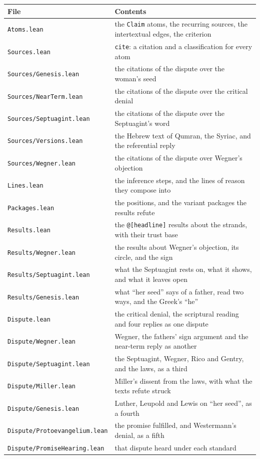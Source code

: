 \documentclass[11pt]{article}
\begin{document}
\begin{longtable}{@{}>{\raggedright\arraybackslash}p{} >{\raggedright\arraybackslash}p{}@{}}
\toprule
\textbf{File} & \textbf{Contents} \\
\midrule
\endhead
\texttt{Atoms.lean} & the \texttt{Claim} atoms, the recurring sources, the intertextual edges, the criterion \\
\texttt{Sources.lean} & \texttt{cite}: a citation and a classification for every atom \\
\texttt{Sources/Genesis.lean} & the citations of the dispute over the woman’s seed \\
\texttt{Sources/Near\allowbreak{}Term.lean} & the citations of the dispute over the critical denial \\
\texttt{Sources/Septuagint.lean} & the citations of the dispute over the Septuagint’s word \\
\texttt{Sources/Versions.lean} & the Hebrew text of Qumran, the Syriac, and the referential reply \\
\texttt{Sources/Wegner.lean} & the citations of the dispute over Wegner’s objection \\
\texttt{Lines.lean} & the inference steps, and the lines of reason they compose into \\
\texttt{Packages.lean} & the positions, and the variant packages the results refute \\
\texttt{Results.lean} & the \texttt{@[headline]} results about the strands, with their trust base \\
\texttt{Results/Wegner.lean} & the results about Wegner’s objection, its circle, and the sign \\
\texttt{Results/Septuagint.lean} & what the Septuagint rests on, what it shows, and what it leaves open \\
\texttt{Results/Genesis.lean} & what “her seed” says of a father, read two ways, and the Greek’s “he” \\
\texttt{Dispute.lean} & the critical denial, the scriptural reading and four replies as one dispute \\
\texttt{Dispute/Wegner.lean} & Wegner, the fathers’ sign argument and the near-term reply as another \\
\texttt{Dispute/Septuagint.lean} & the Septuagint, Wegner, Rico and Gentry, and the laws, as a third \\
\texttt{Dispute/Miller.lean} & Miller’s dissent from the laws, with what the texts refute struck \\
\texttt{Dispute/Genesis.lean} & Luther, Leupold and Lewis on “her seed”, as a fourth \\
\texttt{Dispute/Protoevangelium.lean} & the promise fulfilled, and Westermann’s denial, as a fifth \\
\texttt{Dispute/Promise\allowbreak{}Hearing.lean} & that dispute heard under each standard \\
\bottomrule
\end{longtable}
\end{document}
